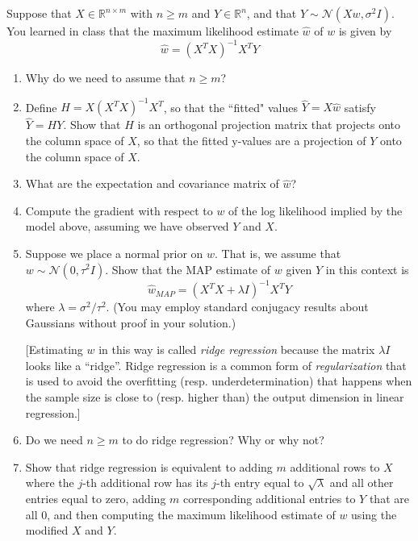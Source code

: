 \documentclass[submit]{harvardml}
\newcommand{\R}{\mathbb{R}}
\newcommand{\N}{\mathcal{N}}
\begin{document}
\begin{problem}
Suppose that $X \in \R^{n \times m}$ with $n \geq m$ and $Y \in \R^n$, and that $Y \sim \N(Xw, \sigma^2 I)$. You learned in class that the maximum likelihood estimate $\hat{w}$ of ${w}$ is given by
\[
\hat{w} = (X^TX)^{-1}X^TY
\]
\begin{enumerate}[label=(\alph*)]
\item Why do we need to assume that $n \geq m$?
\item Define $H = X(X^TX)^{-1}X^T$, so that the ``fitted" values $\hat Y = X\hat{{w}}$ satisfy $\hat Y = HY$. Show that $H$ is an orthogonal projection matrix that projects onto the column space of $X$, so that the fitted y-values are a projection of $Y$ onto the column space of $X$.
\item What are the expectation and covariance matrix of $\hat{w}$?
\item Compute the gradient with respect to ${w}$ of the log likelihood implied by the model above, assuming we have observed $Y$ and $X$.
\item Suppose we place a normal prior on ${w}$. That is, we assume that ${w} \sim \N(0, \tau^2 I)$. Show that the MAP estimate of ${w}$ given $Y$ in this context is
\[
\hat {w}_{MAP} = (X^TX + \lambda I)^{-1}X^T Y
\]
where $\lambda = \sigma^2 / \tau^2$. (You may employ standard conjugacy results about Gaussians without proof in your solution.)

[Estimating ${w}$ in this way is called {\em ridge regression} because the matrix $\lambda I$ looks like a ``ridge''. Ridge regression is a common form of {\em regularization} that is used to avoid the overfitting (resp. underdetermination) that happens when the sample size is close to (resp. higher than) the output dimension in linear regression.]
\item Do we need $n \geq m$ to do ridge regression? Why or why not?
\item Show that ridge regression is equivalent to adding $m$ additional rows to $X$ where the $j$-th additional row has its $j$-th entry equal to $\sqrt{\lambda}$ and all other entries equal to zero, adding $m$ corresponding additional entries to $Y$ that are all 0, and then computing the maximum likelihood estimate of ${w}$ using the modified $X$ and $Y$.
\end{enumerate}
\vspace{0.1cm}
\end{problem}
\end{document}
